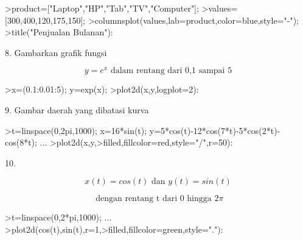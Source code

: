 \documentclass[a4paper,10pt]{article}
\begin{document}
\begin{eulernotebook}
\begin{eulercomment}
\begin{eulercomment}
\begin{eulercomment}
\begin{eulercomment}
\begin{eulercomment}
\begin{eulercomment}
\begin{eulerprompt}
>product=["Laptop","HP","Tab","TV","Computer"];
>values=[300,400,120,175,150];
>columnsplot(values,lab=product,color=blue,style="-");
>title("Penjualan Bulanan"):
\end{eulerprompt}
\begin{eulercomment}
8. Gambarkan grafik fungsi\\
\end{eulercomment}
\begin{eulerformula}
\[
y=e^x \text{  dalam rentang dari 0,1 sampai 5}
\]
\end{eulerformula}
\begin{eulercomment}
\end{eulercomment}
\begin{eulerprompt}
>x=(0.1:0.01:5); y=exp(x);
>plot2d(x,y,logplot=2):
\end{eulerprompt}
\begin{eulercomment}
9. Gambar daerah yang dibatasi kurva

\end{eulercomment}
\begin{eulerprompt}
>t=linspace(0,2pi,1000); x=16*sin(t); y=5*cos(t)-12*cos(7*t)-5*cos(2*t)-cos(8*t); ...
>plot2d(x,y,>filled,fillcolor=red,style="/",r=50):
\end{eulerprompt}
\begin{eulercomment}
10.\\
\end{eulercomment}
\begin{eulerformula}
\[
x(t)=cos(t) \text{ dan } y(t)=sin(t)
\]
\end{eulerformula}
\begin{eulerformula}
\[
\text{ dengan rentang t dari 0 hingga } 2\pi
\]
\end{eulerformula}
\begin{eulerprompt}
>t=linspace(0,2*pi,1000); ...
>plot2d(cos(t),sin(t),r=1,>filled,fillcolor=green,style="."):
\end{eulerprompt}
\begin{euleroutput}
  

\end{euleroutput}
\end{eulercomment}
\end{eulercomment}
\end{eulercomment}
\end{eulercomment}
\end{eulercomment}
\end{eulercomment}
\end{eulernotebook}
\end{document}
